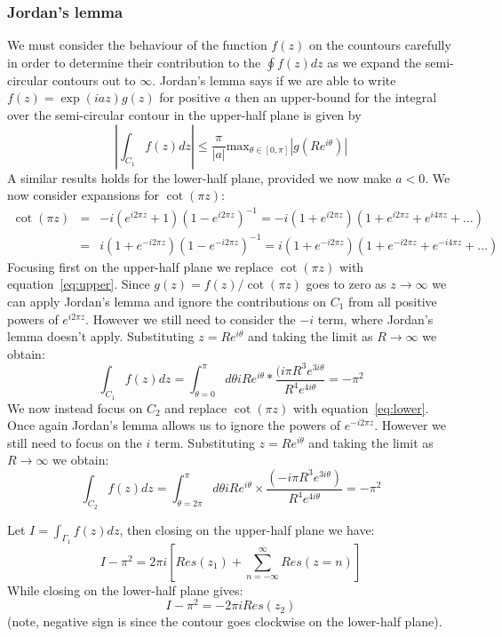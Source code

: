 \subsubsection{Jordan's lemma}
We must consider the behaviour of the function $f(z)$ on the countours carefully in order to determine their contribution to the $\oint f(z) dz$ as we expand the semi-circular contours out to $\infty$.  Jordan's lemma says if we are able to write $f(z) = \exp(iaz)g(z)$ for positive $a$ then an upper-bound for the integral over the semi-circular contour in the upper-half plane is given by
\begin{equation}
\left|\int_{C_{1}}f(z)dz\right| \leq \frac{\pi}{|a|}\text{max}_{\theta\in [0,\pi]}\left|g(Re^{i\theta})\right|
\end{equation}
A similar results holds for the lower-half plane, provided we now make $a<0$.  We now consider expansions for $\cot(\pi z)$:
\begin{eqnarray}
\cot(\pi z)&=&-i(e^{i2\pi z}+1)(1-e^{i2\pi z})^{-1}=-i(1+e^{i2\pi z})(1+e^{i2\pi z}+e^{i4\pi z}+\ldots)\label{eq:upper}\\
&=&i(1+e^{-i2\pi z})(1-e^{-i2\pi z})^{-1}=i(1+e^{-i2\pi z})(1+e^{-i2\pi z}+e^{-i4\pi z}+\ldots)\label{eq:lower}
\end{eqnarray}
Focusing first on the upper-half plane we replace $\cot(\pi z)$ with equation~\ref{eq:upper}.  Since $g(z)=f(z)/\cot(\pi z)$ goes to zero as $z\rightarrow\infty$ we can apply Jordan's lemma and ignore the contributions on $C_{1}$ from all positive powers of $e^{i2\pi z}$.  However we still need to consider the $-i$ term, where Jordan's lemma doesn't apply.  Substituting $z=Re^{i\theta}$ and taking the limit as $R\rightarrow\infty$ we obtain:
\begin{equation}
\int_{C_{1}}f(z)dz = \int_{\theta=0}^{\pi}d\theta iRe^{i\theta}*\frac{(i\pi R^{3}e^{3i\theta}}{R^{4}e^{4i\theta}} = -\pi^{2}
\end{equation}
We now instead focus on $C_{2}$ and replace $\cot(\pi z)$ with equation~\ref{eq:lower}.  Once again Jordan's lemma allows us to ignore the powers of $e^{-i2\pi z}$.  However we still need to focus on the $i$ term.  Substituting $z=Re^{i\theta}$ and taking the limit as $R\rightarrow\infty$ we obtain:
\begin{equation}
\int_{C_{2}}f(z)dz = \int_{\theta=2\pi}^{\pi}d\theta iRe^{i\theta}\times\frac{(-i\pi R^{3}e^{3i\theta})}{R^{4}e^{4i\theta}} = -\pi^{2}
\end{equation}

Let $I=\int_{\Gamma_{1}}f(z)dz$, then closing on the upper-half plane we have:
\begin{equation}
I-\pi^{2} = 2\pi i\left[Res(z_{1})+\sum_{n=-\infty}^{\infty}Res(z=n)\right]
\end{equation}
While closing on the lower-half plane gives:
\begin{equation}
I-\pi^{2} = -2\pi i Res(z_{2})
\end{equation}
(note, negative sign is since the contour goes clockwise on the lower-half plane).

